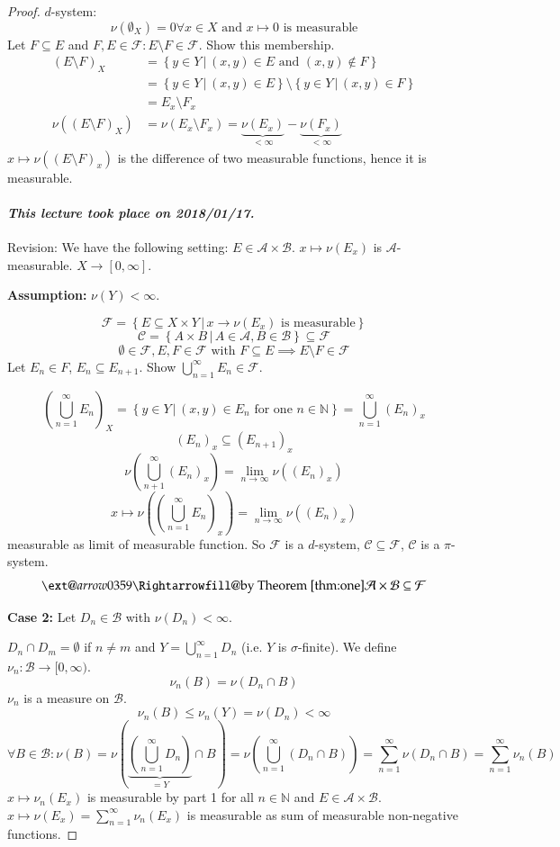 \documentclass{article}
\makeatletter
\newcommand{\setdef}[2]{\left\{\left.#1\,\right|\,#2\right\}}
\newcommand{\dateref}[1]{\paragraph{\textit{This lecture took place on #1.}}}
\newcommand{\xRightarrow}[2][]{\ext@arrow 0359\Rightarrowfill@{#1}{#2}}
\makeatother
\begin{document}
\begin{proof}
  $d$-system:
  \[ \nu(\emptyset_X) = 0 \forall x \in X \text{ and } x \mapsto 0 \text{ is measurable} \]
  Let $F \subseteq E$ and $F, E \in \mathcal F: E \setminus F \in \mathcal F$.
  Show this membership.
  \begin{align*}
    (E \setminus F)_X &= \setdef{y \in Y}{(x, y) \in E \text{ and } (x,y) \not\in F} \\
      &= \setdef{y \in Y}{(x, y) \in E} \setminus \setdef{y \in Y}{(x, y) \in F} \\
      &= E_x \setminus F_x \\
    \nu((E \setminus F)_X) &= \nu(E_x \setminus F_x) = \underbrace{\nu(E_x)}_{<\infty} - \underbrace{\nu(F_x)}_{<\infty}
  \end{align*}
  $x \mapsto \nu((E \setminus F)_x)$ is the difference of two measurable functions, hence it is measurable.

  \dateref{2018/01/17}

  Revision: We have the following setting: $E \in \mathcal A \times \mathcal B$.
  $x \mapsto \nu(E_x)$ is $\mathcal A$-measurable. $X \to [0, \infty]$.

  \textbf{Assumption:} $\nu(Y) < \infty$.

  \[ \mathcal F = \setdef{E \subseteq X \times Y}{x \to \nu(E_x) \text{ is measurable}} \]
  \[ \mathcal C = \setdef{A \times B}{A \in \mathcal A, B \in \mathcal B} \subseteq \mathcal F \]
  \[ \emptyset \in \mathcal F, E,F \in \mathcal F \text{ with } F \subseteq E \implies E \setminus F \in \mathcal F \]
  Let $E_n \in F$, $E_n \subseteq E_{n+1}$. Show $\bigcup_{n=1}^\infty E_n \in \mathcal F$.

  \[ \left(\bigcup_{n=1}^\infty E_n\right)_X = \setdef{y \in Y}{(x, y) \in E_n \text{ for one } n \in \mathbb N} = \bigcup_{n=1}^\infty (E_n)_x \]
  \[ (E_n)_x \subseteq (E_{n+1})_x \]
  \[ \nu\left(\bigcup_{n+1}^\infty (E_n)_x\right) = \lim_{n\to\infty} \nu((E_n)_x) \]
  \[ x \mapsto \nu\left(\left(\bigcup_{n=1}^\infty E_n\right)_x\right) = \lim_{n\to\infty} \nu((E_n)_x) \]
  measurable as limit of measurable function.
  So $\mathcal F$ is a $d$-system, $\mathcal C \subseteq \mathcal F$, $\mathcal C$ is a $\pi$-system.
  \[ \xRightarrow{\text{by Theorem~\ref{thm:one}}} \mathcal A \times \mathcal B \subseteq \mathcal F \]

  \textbf{Case 2:} Let $D_n \in \mathcal B$ with $\nu(D_n) < \infty$.

  $D_n \cap D_m = \emptyset$ if $n \neq m$ and $Y = \bigcup_{n=1}^\infty D_n$ (i.e. $Y$ is $\sigma$-finite).
  We define $\nu_n: \mathcal B \to [0, \infty)$.
  \[ \nu_n(B) = \nu(D_n \cap B) \]
  $\nu_n$ is a measure on $\mathcal B$.
  \[ \nu_n(B) \leq \nu_n(Y) = \nu(D_n) < \infty \]
  \[
    \forall B \in \mathcal B: \nu(B) = \nu\left(\underbrace{\left(\bigcup_{n=1}^\infty D_n\right)}_{=Y} \cap B\right)
    = \nu\left(\bigcup_{n=1}^\infty \left(D_n \cap B\right)\right)
    = \sum_{n=1}^\infty \nu\left(D_n \cap B\right)
    = \sum_{n=1}^\infty \nu_n(B)
  \]
  $x \mapsto \nu_n(E_x)$ is measurable by part 1 for all $n \in \mathbb N$ and $E \in \mathcal A \times \mathcal B$.
  $x \mapsto \nu(E_x) = \sum_{n=1}^\infty \nu_n(E_x)$ is measurable as sum of measurable non-negative functions.
\end{proof}
\end{document}
